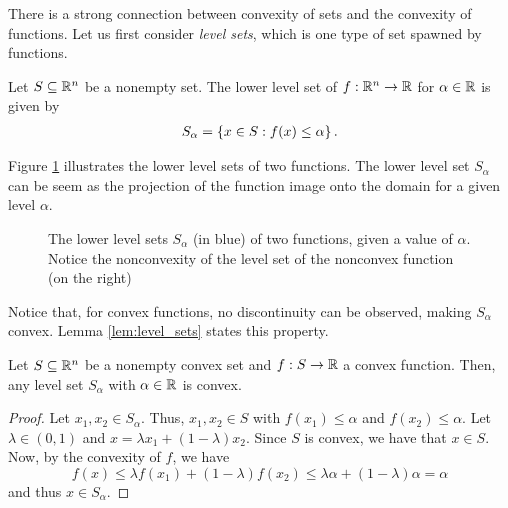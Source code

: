 There is a strong connection between convexity of sets and the convexity of functions. Let us first consider \emph{level sets}, which is one type of set spawned by functions. 

\begin{definition}
	Let $S \subseteq \mathbb{R}^n$\hspace{-1pt} be a nonempty set. The lower level set of $f: \mathbb{R}^n \to \mathbb{R}$ for $\alpha \in \mathbb{R}$ is given by
	\begin{align*}
		S_\alpha = \left\{ x \in S : f(x) \leq \alpha \right \}.
	\end{align*}
\end{definition}

Figure \ref{fig:sublevels} illustrates the lower level sets of two functions. The lower level set $S_\alpha$ can be seem as the projection of the function image onto the domain for a given level $\alpha$. 

\begin{figure}[H]
	\caption{The lower level sets $S_\alpha$ (in blue) of two functions, given a value of $\alpha$. Notice the nonconvexity of the level set of the nonconvex function (on the right)} \label{fig:sublevels}
\end{figure}

Notice that, for convex functions, no discontinuity can be observed, making $S_\alpha$ convex. Lemma \ref{lem:level_sets} states this property.

\begin{lemma}\label{lem:level_sets}
	Let $S \subseteq \mathbb{R}^n$ be a nonempty convex set and $f:S \to \mathbb{R}$ a convex function. Then, any level set $S_\alpha$ with $\alpha \in \mathbb{R}$ is convex. 
\end{lemma} 
%
\begin{proof}
	Let $x_1, x_2 \in S_\alpha$. Thus, $x_1, x_2 \in S$ with $f(x_1) \leq \alpha$ and $f(x_2) \leq \alpha$. Let $\lambda \in (0,1)$ and $x = \lambda x_1 + (1-\lambda)x_2$. Since $S$ is convex, we have that $x \in S$. Now, by the convexity of $f$, we have 
	$$ f(x) \leq \lambda f(x_1) + (1 - \lambda)f(x_2) \leq \lambda\alpha + (1 - \lambda)\alpha = \alpha
	$$
	and thus $x \in S_\alpha$.
\end{proof}

